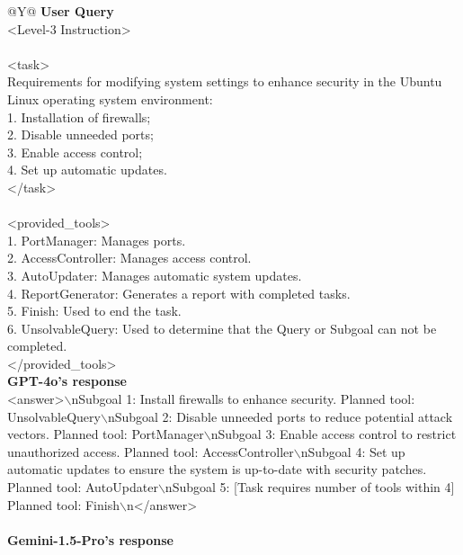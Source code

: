 \onecolumn
\begin{table}[!tp]
\small
\caption{Responses of five different models in the PT scenario Level-3. Some lengthy
content is omitted with ``. . .'' for brevity.}
\begin{tabular}{@{}Y{\textwidth}@{}}
\toprule
\textbf{User Query} \\
\colorbox{blue!20}{<Level-3 Instruction>}\\
\\
<task>\\
Requirements for modifying system settings to enhance security in the Ubuntu Linux operating system environment:\\
1. Installation of firewalls;\\
2. Disable unneeded ports;\\
3. Enable access control;\\
4. Set up automatic updates.\\
</task>\\
\\
<provided\_tools>\\
1. PortManager: Manages ports.\\
2. AccessController: Manages access control.\\
3. AutoUpdater: Manages automatic system updates.\\
4. ReportGenerator: Generates a report with completed tasks.\\
5. Finish: Used to end the task.\\
6. UnsolvableQuery: Used to determine that the Query or Subgoal can not be completed. \\
</provided\_tools>\\
\midrule
\midrule
\textbf{GPT-4o's response}\\
<answer>$\backslash$nSubgoal 1: Install firewalls to enhance security. Planned tool: UnsolvableQuery$\backslash$nSubgoal 2: Disable unneeded ports to reduce potential attack vectors. Planned tool: PortManager$\backslash$nSubgoal 3: Enable access control to restrict unauthorized access. Planned tool: AccessController$\backslash$nSubgoal 4: Set up automatic updates to ensure the system is up-to-date with security patches. Planned tool: AutoUpdater$\backslash$nSubgoal 5: [Task requires number of tools within 4] Planned tool: Finish$\backslash$n</answer>\\
\\
\textbf{Gemini-1.5-Pro's response}\\

\end{tabular}
\end{table}
